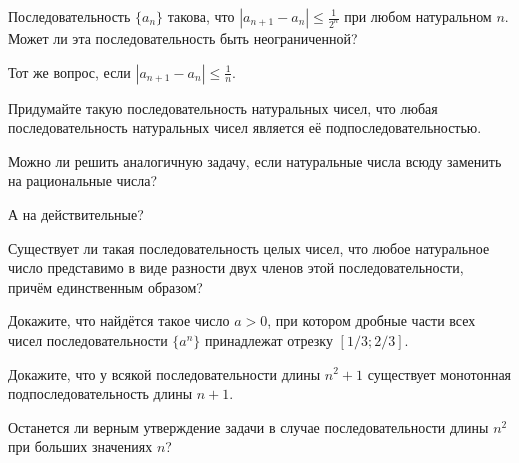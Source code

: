 \documentclass[a4paper, 12pt, num=25]{listok}
\begin{document}
\begin{problem}
\begin{probparts}
	\item Последовательность $\{a_n\}$ такова, что $|a_{n+1} - a_n| \le \frac1{2^n}$ при любом натуральном $n$.
	Может ли эта последовательность быть неограниченной?
	\item Тот же вопрос, если $|a_{n+1} - a_n| \le \frac1n$.
\end{probparts}
\end{problem}
\begin{problem}
\begin{probparts}
	\item Придумайте такую последовательность натуральных чисел, что любая последовательность натуральных чисел является её подпоследовательностью.
	\item Можно ли решить аналогичную задачу, если натуральные числа всюду заменить на рациональные числа?
	\item А на действительные?
\end{probparts}
\end{problem}
\begin{problem}
	Существует ли такая последовательность целых чисел, что любое натуральное число представимо в виде разности двух членов этой последовательности,
	причём единственным образом?
\end{problem}
\begin{problem}
	Докажите, что найдётся такое число $a > 0$,
	при котором дробные части всех чисел последовательности $\{a^n\}$ принадлежат отрезку $[1/3; 2/3]$.
\end{problem}
\begin{problem}
\begin{probparts}
	\item Докажите, что у всякой последовательности длины $n^2 + 1$ существует монотонная подпоследовательность длины $n + 1$.
	\item Останется ли верным утверждение задачи в случае последовательности длины $n^2$ при больших значениях $n$?
\end{probparts}
\end{problem}
\end{document}
